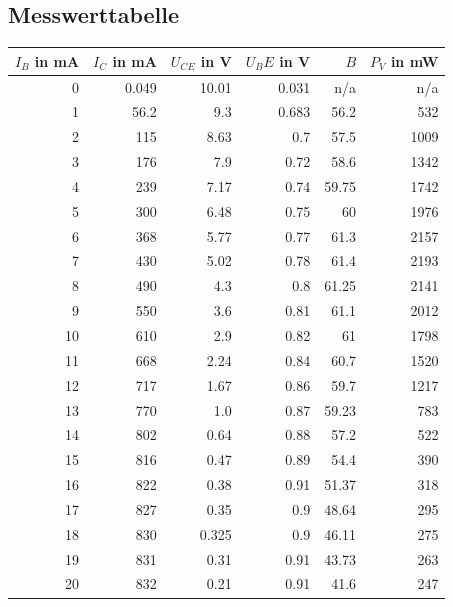 \documentclass[
a4paper,     %
 headsepline, %
11pt         %
]{scrartcl}  %
\begin{document}
\subsection{Messwerttabelle}
\begin{center}
\begin{tabular}{ r | r | r | r | r | r }
    $I_B$ in mA & $I_C$ in mA & $U_{CE}$ in V & $U_BE$ in V & $B$    & $P_V$ in mW \\ \hline
    0           & 0.049       & 10.01         & 0.031       & n/a    &  n/a \\
    1           & 56.2        & 9.3           & 0.683       & 56.2   & 532  \\  
    2           & 115         & 8.63          & 0.7         & 57.5   & 1009 \\
    3           & 176         & 7.9           & 0.72        & 58.6   & 1342\\
    4           & 239         & 7.17          & 0.74        & 59.75  & 1742 \\
    5           & 300         & 6.48          & 0.75        & 60     & 1976 \\
    6           & 368         & 5.77          & 0.77        & 61.3   & 2157 \\
    7           & 430         & 5.02          & 0.78        & 61.4   & 2193 \\
    8           & 490         & 4.3           & 0.8         & 61.25  & 2141 \\
    9           & 550         & 3.6           & 0.81        & 61.1   & 2012 \\
    10          & 610         & 2.9           & 0.82        & 61     & 1798 \\
    11          & 668         & 2.24          & 0.84        & 60.7   & 1520 \\
    12          & 717         & 1.67          & 0.86        & 59.7   & 1217 \\
    13          & 770         & 1.0           & 0.87        & 59.23  & 783 \\
    14          & 802         & 0.64          & 0.88        & 57.2   & 522 \\
    15          & 816         & 0.47          & 0.89        & 54.4   & 390 \\
    16          & 822         & 0.38          & 0.91        & 51.37  & 318 \\
    17          & 827         & 0.35          & 0.9         & 48.64  & 295 \\
    18          & 830         & 0.325         & 0.9         & 46.11  & 275 \\
    19          & 831         & 0.31          & 0.91        & 43.73  & 263 \\
    20          & 832         & 0.21          & 0.91        & 41.6   & 247 \\
    \hline
\end{tabular} \\
\end{center}
\end{document}

